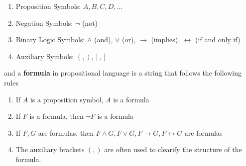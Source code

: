 \documentclass[11pt]{book}
\begin{document}
\begin{enumerate}[label=\roman*.]
	\item Proposition Symbols: $A,B,C,D,\dots$
	\item Negation Symbols: $\neg$ (not)
	\item Binary Logic Symbols: $\land$ (and), $\lor$ (or), $\rightarrow$ (implies), $\leftrightarrow$ (if and only if)
	\item Auxiliary Symbols: $(,),[,]$
\end{enumerate}
and a \textbf{formula} in propositional language is a string that follows the following rules
\begin{enumerate}
	\item If $A$ is a proposition symbol, $A$ is a formula
	\item If $F$ is a formula, then $\neg F$ is a formula
	\item If $F,G$ are formulas, then $F\land G,F\lor G,F\rightarrow G,F\leftrightarrow G$ are formulas
	\item The auxiliary brackets $(,)$ are often used to clearify the structure of the formula.
\end{enumerate}
\end{document}

